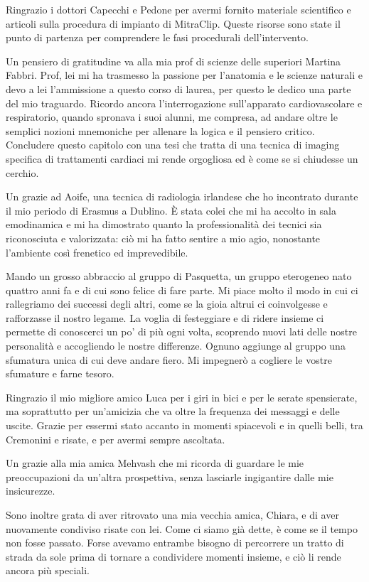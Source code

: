 \documentclass[12pt,a4paper,twoside]{article}
\begin{document}
Ringrazio i dottori Capecchi e Pedone per avermi fornito materiale scientifico e articoli sulla procedura di impianto di MitraClip. Queste risorse sono state il punto di partenza per comprendere le fasi procedurali dell'intervento.

Un pensiero di gratitudine va alla mia prof di scienze delle superiori Martina Fabbri. Prof, lei mi ha trasmesso la passione per l'anatomia e le scienze naturali e devo a lei l'ammissione a questo corso di laurea, per questo le dedico una parte del mio traguardo. Ricordo ancora l'interrogazione sull'apparato cardiovascolare e respiratorio, quando spronava i suoi alunni, me compresa, ad andare oltre le semplici nozioni mnemoniche per allenare la logica e il pensiero critico. Concludere questo capitolo con una tesi che tratta di una tecnica di imaging specifica di trattamenti cardiaci mi rende orgogliosa ed è come se si chiudesse un cerchio.

Un grazie ad Aoife, una tecnica di radiologia irlandese che ho incontrato durante il mio periodo di Erasmus a Dublino. È stata colei che mi ha accolto in sala emodinamica e mi ha dimostrato quanto la professionalità dei tecnici sia riconosciuta e valorizzata: ciò mi ha fatto sentire a mio agio, nonostante l'ambiente così frenetico ed imprevedibile.

Mando un grosso abbraccio al gruppo di Pasquetta, un gruppo eterogeneo nato quattro anni fa e di cui sono felice di fare parte. Mi piace molto il modo in cui ci rallegriamo dei successi degli altri, come se la gioia altrui ci coinvolgesse e rafforzasse il nostro legame. La voglia di festeggiare e di ridere insieme ci permette di conoscerci un po' di più ogni volta, scoprendo nuovi lati delle nostre personalità e accogliendo le nostre differenze. Ognuno aggiunge al gruppo una sfumatura unica di cui deve andare fiero. Mi impegnerò a cogliere le vostre sfumature e farne tesoro.

Ringrazio il mio migliore amico Luca per i giri in bici e per le serate spensierate, ma soprattutto per un'amicizia che va oltre la frequenza dei messaggi e delle uscite. Grazie per essermi stato accanto in momenti spiacevoli e in quelli belli, tra Cremonini e risate, e per avermi sempre ascoltata.

Un grazie alla mia amica Mehvash che mi ricorda di guardare le mie preoccupazioni da un'altra prospettiva, senza lasciarle ingigantire dalle mie insicurezze.

Sono inoltre grata di aver ritrovato una mia vecchia amica, Chiara, e di aver nuovamente condiviso risate con lei. Come ci siamo già dette, è come se il tempo non fosse passato. Forse avevamo entrambe bisogno di percorrere un tratto di strada da sole prima di tornare a condividere momenti insieme, e ciò li rende ancora più speciali.
\end{document}
